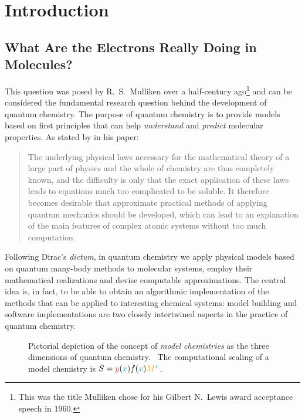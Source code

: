{}

\chapter*{Introduction}

\renewcommand{\thefigure}{\Alph{figure}}

\begin{epigraphs}
\end{epigraphs}


\section*{What Are the Electrons Really Doing in Molecules?}

This question was posed by R.~S.~Mulliken over a half-century
ago\footnote{This was the title Mulliken chose for his Gilbert N.~Lewis
award acceptance speech in 1960.}
and can be considered the fundamental research question behind the
development of quantum chemistry.
The purpose of quantum chemistry is to provide models based on first
principles that can help \emph{understand} and \emph{predict} molecular properties.
As stated by \citeauthor{Dirac1929-gn} in his 
paper:\autocite{Dirac1929-gn, Kutzelnigg2000-fl}
\blockquote{The underlying physical laws necessary for the mathematical
theory of a large part of physics and the whole of chemistry are thus
completely known, and the difficulty is only that the exact application of
these laws leads to equations much too complicated to be soluble. It
therefore becomes desirable that approximate practical methods of
applying quantum mechanics should be developed, which can lead to an
explanation of the main features of complex atomic systems without too
much computation.}
Following Dirac's \emph{dictum}, in quantum chemistry we apply physical
models based on quantum many-body methods to molecular systems, employ
their mathematical realizations and devise computable approximations.
The central idea is, in fact, to be able to obtain an algorithmic
implementation of the methods that can be applied to interesting
chemical systems: model building and software implementations are two
closely intertwined aspects in the practice of quantum chemistry.

\begin{figure}[tb]
\centering
\scalebox{0.7}{}
\caption[Pictorial depiction of the concept of \emph{model chemistries}.]{
Pictorial depiction of the concept of \emph{model chemistries} as the
three dimensions of quantum chemistry.~\autocite{Pople1999-gt, Saue2011-qg}
The computational scaling of a model chemistry is
$S=\textcolor{PMS1797}{y}(\textcolor{PMS2229}{x})f(\textcolor{PMS2229}{x})\textcolor{PMS130}{M}^{\textcolor{PMS2229}{x}}$.
}
\label{fig:RQC-axis}
\end{figure}

